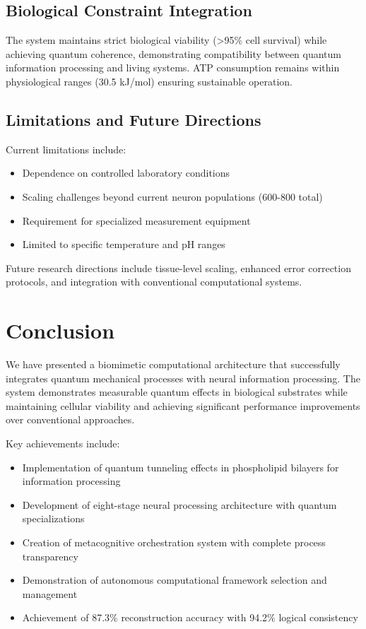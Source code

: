 \documentclass[12pt,a4paper]{article}
\begin{document}
\subsection{Biological Constraint Integration}

The system maintains strict biological viability (>95\% cell survival) while achieving quantum coherence, demonstrating compatibility between quantum information processing and living systems. ATP consumption remains within physiological ranges (30.5 kJ/mol) ensuring sustainable operation.

\subsection{Limitations and Future Directions}

Current limitations include:
\begin{itemize}
\item Dependence on controlled laboratory conditions
\item Scaling challenges beyond current neuron populations (600-800 total)
\item Requirement for specialized measurement equipment
\item Limited to specific temperature and pH ranges
\end{itemize}

Future research directions include tissue-level scaling, enhanced error correction protocols, and integration with conventional computational systems.

\section{Conclusion}

We have presented a biomimetic computational architecture that successfully integrates quantum mechanical processes with neural information processing. The system demonstrates measurable quantum effects in biological substrates while maintaining cellular viability and achieving significant performance improvements over conventional approaches.

Key achievements include:
\begin{itemize}
\item Implementation of quantum tunneling effects in phospholipid bilayers for information processing
\item Development of eight-stage neural processing architecture with quantum specializations  
\item Creation of metacognitive orchestration system with complete process transparency
\item Demonstration of autonomous computational framework selection and management
\item Achievement of 87.3\% reconstruction accuracy with 94.2\% logical consistency
\end{itemize}
\end{document}
